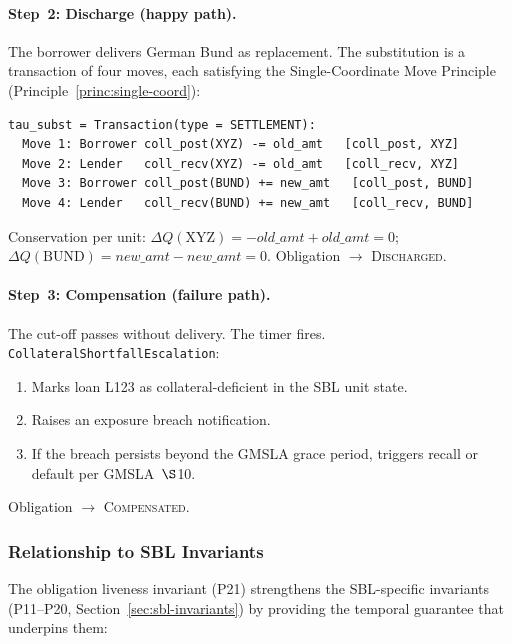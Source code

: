 \documentclass[11pt,a4paper]{article}
\begin{document}
\paragraph{Step~2: Discharge (happy path).} The borrower delivers German Bund as replacement. The substitution is a transaction of four moves, each satisfying the Single-Coordinate Move Principle (Principle~\ref{princ:single-coord}):

\begin{lstlisting}
tau_subst = Transaction(type = SETTLEMENT):
  Move 1: Borrower coll_post(XYZ) -= old_amt   [coll_post, XYZ]
  Move 2: Lender   coll_recv(XYZ) -= old_amt   [coll_recv, XYZ]
  Move 3: Borrower coll_post(BUND) += new_amt   [coll_post, BUND]
  Move 4: Lender   coll_recv(BUND) += new_amt   [coll_recv, BUND]
\end{lstlisting}

\noindent Conservation per unit: $\Delta Q(\text{XYZ}) = -\mathit{old\_amt} + \mathit{old\_amt} = 0$; $\Delta Q(\text{BUND}) = \mathit{new\_amt} - \mathit{new\_amt} = 0$. Obligation $\to$ \textsc{Discharged}.

\paragraph{Step~3: Compensation (failure path).} The cut-off passes without delivery. The timer fires. \texttt{CollateralShortfallEscalation}:
\begin{enumerate}[nosep]
\item Marks loan L123 as collateral-deficient in the SBL unit state.
\item Raises an exposure breach notification.
\item If the breach persists beyond the GMSLA grace period, triggers recall or default per GMSLA~$\S$10.
\end{enumerate}
Obligation $\to$ \textsc{Compensated}.

\subsubsection{Relationship to SBL Invariants}
\label{sec:obligation-sbl-relationship}

The obligation liveness invariant (P21) strengthens the SBL-specific invariants (P11--P20, Section~\ref{sec:sbl-invariants}) by providing the temporal guarantee that underpins them:
\end{document}
